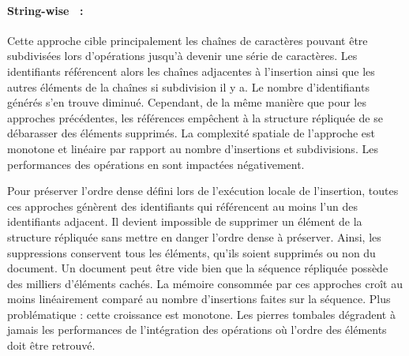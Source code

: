 \paragraph{String-wise~\cite{yu2012stringwise} :} Cette approche cible
principalement les chaînes de caractères pouvant être subdivisées lors
d'opérations jusqu'à devenir une série de caractères. Les identifiants
référencent alors les chaînes adjacentes à l'insertion ainsi que les autres
éléments de la chaînes si subdivision il y a. Le nombre d'identifiants générés
s'en trouve diminué. Cependant, de la même manière que pour les approches
précédentes, les références empêchent à la structure répliquée de se débarasser
des éléments supprimés. La complexité spatiale de l'approche est monotone et
linéaire par rapport au nombre d'insertions et subdivisions. Les performances
des opérations en sont impactées négativement.


Pour préserver l'ordre dense défini lors de l'exécution locale de l'insertion,
toutes ces approches génèrent des identifiants qui référencent au moins l'un
des identifiants adjacent. Il devient impossible de supprimer un élément de la
structure répliquée sans mettre en danger l'ordre dense à préserver. Ainsi, les
suppressions conservent tous les éléments, qu'ils soient supprimés ou non du
document.  Un document peut être vide bien que la séquence répliquée possède des
milliers d'éléments cachés. La mémoire consommée par ces approches croît au
moins linéairement comparé au nombre d'insertions faites sur la séquence. Plus
problématique : cette croissance est monotone.  Les pierres tombales dégradent à
jamais les performances de l'intégration des opérations où l'ordre des éléments
doit être retrouvé.

